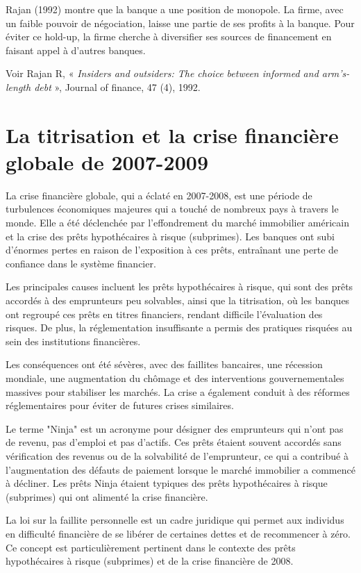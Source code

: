 \documentclass[a4paper, 12pt]{report}
\begin{document}
Rajan (1992) montre que la banque a une position de monopole. La firme, avec un faible pouvoir de négociation, laisse une partie de ses profits à la banque. Pour éviter ce hold-up, la firme cherche à diversifier ses sources de financement en faisant appel à d’autres banques.

Voir Rajan R, « \textit{Insiders and outsiders: The choice between informed and arm’s-length debt} », Journal of finance, 47 (4), 1992.

\section{La titrisation et la crise financière globale de 2007-2009}

La crise financière globale, qui a éclaté en 2007-2008, est une période de turbulences économiques majeures qui a touché de nombreux pays à travers le monde. Elle a été déclenchée par l'effondrement du marché immobilier américain et la crise des prêts hypothécaires à risque (subprimes). Les banques ont subi d'énormes pertes en raison de l'exposition à ces prêts, entraînant une perte de confiance dans le système financier. 

Les principales causes incluent les prêts hypothécaires à risque, qui sont des prêts accordés à des emprunteurs peu solvables, ainsi que la titrisation, où les banques ont regroupé ces prêts en titres financiers, rendant difficile l'évaluation des risques. De plus, la réglementation insuffisante a permis des pratiques risquées au sein des institutions financières.

Les conséquences ont été sévères, avec des faillites bancaires, une récession mondiale, une augmentation du chômage et des interventions gouvernementales massives pour stabiliser les marchés. La crise a également conduit à des réformes réglementaires pour éviter de futures crises similaires.

Le terme "Ninja" est un acronyme pour désigner des emprunteurs qui n'ont pas de revenu, pas d'emploi et pas d'actifs. Ces prêts étaient souvent accordés sans vérification des revenus ou de la solvabilité de l'emprunteur, ce qui a contribué à l'augmentation des défauts de paiement lorsque le marché immobilier a commencé à décliner. Les prêts Ninja étaient typiques des prêts hypothécaires à risque (subprimes) qui ont alimenté la crise financière.

La loi sur la faillite personnelle est un cadre juridique qui permet aux individus en difficulté financière de se libérer de certaines dettes et de recommencer à zéro. Ce concept est particulièrement pertinent dans le contexte des prêts hypothécaires à risque (subprimes) et de la crise financière de 2008.
\end{document}
